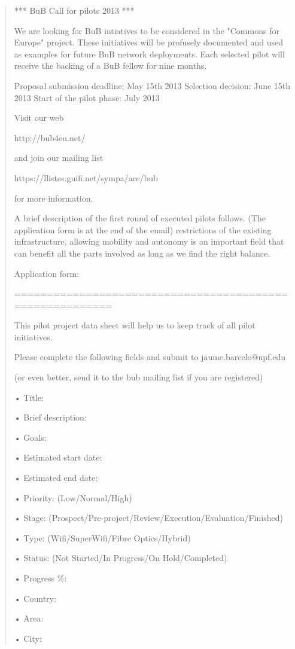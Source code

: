\documentclass[draftclsnofoot,12pt,journal,onecolumn]{IEEEtran}
\begin{document}
\begin{quotation}
*** BuB Call for pilots 2013 ***


We are looking for BuB intiatives to be considered in the "Commons for
Europe" project. These initiatives will be profusely documented and
used as examples for future BuB network deployments. Each selected
pilot will receive the backing of a BuB fellow for nine months.

Proposal submission deadline: May 15th 2013
Selection decision: June 15th 2013
Start of the pilot phase: July 2013

Visit our web

http://bub4eu.net/

and join our mailing list

https://llistes.guifi.net/sympa/arc/bub

for more information.


A brief description of the first round of executed pilots follows.
(The application form is at the end of the email)
restrictions of the existing infrastructure, allowing mobility and
autonomy is an important field that can benefit all the parts involved
as long as we find the right balance.



Application form:

=========================================================

This pilot project data sheet will help us to keep track of all pilot
initiatives.

Please complete the following fields and submit to jaume.barcelo@upf.edu

(or even better, send it to the bub mailing list if you are registered)

• Title:

• Brief description:

• Goals:

• Estimated start date:

• Estimated end date:

• Priority: (Low/Normal/High)

• Stage: (Prospect/Pre-project/Review/Execution/Evaluation/Finished)

• Type: (Wifi/SuperWifi/Fibre Optics/Hybrid)

• Status: (Not Started/In Progress/On Hold/Completed)

• Progress \%:

• Country:

• Area:

• City:


\end{quotation}
\end{document}
